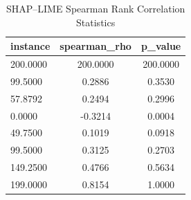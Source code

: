\begin{table}
\centering
\caption{SHAP–LIME Spearman Rank Correlation Statistics}
\label{tab:agreement}
\begin{tabular}{lcc}
\toprule
instance & spearman_rho & p_value \\
\midrule
200.0000 & 200.0000 & 200.0000 \\
99.5000 & 0.2886 & 0.3530 \\
57.8792 & 0.2494 & 0.2996 \\
0.0000 & -0.3214 & 0.0004 \\
49.7500 & 0.1019 & 0.0918 \\
99.5000 & 0.3125 & 0.2703 \\
149.2500 & 0.4766 & 0.5634 \\
199.0000 & 0.8154 & 1.0000 \\
\bottomrule
\end{tabular}
\end{table}
